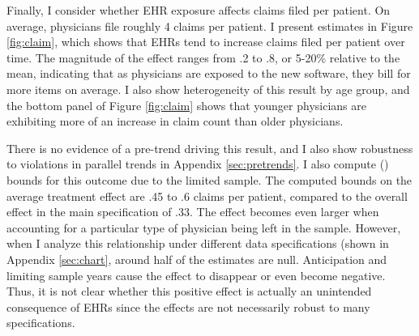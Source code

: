 \documentclass[12pt]{article}
\begin{document}
Finally, I consider whether EHR exposure affects claims filed per patient. On average, physicians file roughly 4 claims per patient. I present estimates in Figure \ref{fig:claim}, which shows that EHRs tend to increase claims filed per patient over time. The magnitude of the effect ranges from .2 to .8, or 5-20\% relative to the mean, indicating that as physicians are exposed to the new software, they bill for more items on average.  I also show heterogeneity of this result by age group, and the bottom panel of Figure \ref{fig:claim} shows that younger physicians are exhibiting more of an increase in claim count than older physicians.

There is no evidence of a pre-trend driving this result, and I also show robustness to violations in parallel trends in Appendix \ref{sec:pretrends}. I also compute \citeauthor{lee2009training} (\citeyear{lee2009training}) bounds for this outcome due to the limited sample. The computed bounds on the average treatment effect are .45 to .6 claims per patient, compared to the overall effect in the main specification of .33. The effect becomes even larger when accounting for a particular type of physician being left in the sample. However, when I analyze this relationship under different data specifications (shown in Appendix \ref{sec:chart}, around half of the estimates are null. Anticipation and limiting sample years cause the effect to disappear or even become negative. Thus, it is not clear whether this positive effect is actually an unintended consequence of EHRs since the effects are not necessarily robust to many specifications. 
      
\end{document}
